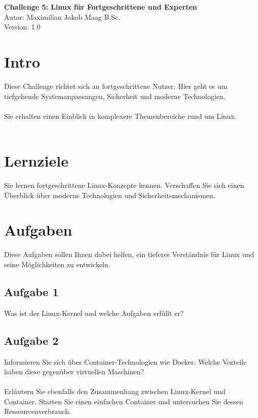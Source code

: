 \documentclass{article}
\begin{document}
    \begin{center}
        \Large \textbf{Challenge 5: Linux für Fortgeschrittene und Experten} \\ [6pt]
        \normalsize
        Autor: Maximilian Jakob Maag B.Sc. \\
        Version: 1.0
    \end{center}

    \section{Intro}
    Diese Challenge richtet sich an fortgeschrittene Nutzer.
    Hier geht es um tiefgehende Systemanpassungen, Sicherheit und moderne Technologien. \\\\
    Sie erhalten einen Einblick in komplexere Themenbereiche rund um Linux. \\\\

    \section{Lernziele}
    Sie lernen fortgeschrittene Linux-Konzepte kennen.
    Verschaffen Sie sich einen Überblick über moderne Technologien und Sicherheitsmechanismen.

    \section{Aufgaben}
    Diese Aufgaben sollen Ihnen dabei helfen, ein tieferes Verständnis für Linux und seine Möglichkeiten zu entwickeln.

    \subsection{Aufgabe 1}
    Was ist der Linux-Kernel und welche Aufgaben erfüllt er?

    \subsection{Aufgabe 2}
    Informieren Sie sich über Container-Technologien wie Docker.
    Welche Vorteile haben diese gegenüber virtuellen Maschinen? \\ \\
    Erläutern Sie ebenfalls den Zusammenhang zwischen Linux-Kernel und Container.
    Starten Sie einen einfachen Container und untersuchen Sie dessen Ressourcenverbrauch.
\end{document}
